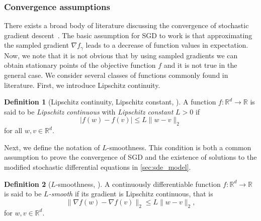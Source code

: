 \documentclass[12pt]{article}
\theoremstyle{definition}
\newtheorem{definition}[definition]{Definition}
\numberwithin{equation}{section}
\newcommand{\R}{\mathbb{R}}
\newcommand{\norm}[1]{\lVert{#1}\rVert_2}
\begin{document}
\subsubsection{Convergence assumptions}
There exists a broad body of literature discussing the convergence of stochastic gradient descent~\cite{allen-zhuConvergenceTheoryDeep2019,mertikopoulosAlmostSureConvergence2020,vaswaniFastFasterConvergence2019,gowerSGDGeneralAnalysis2019,liConvergenceStochasticGradient2019,sebbouhAlmostSureConvergence2021,bottouOptimizationMethodsLargeScale2018}.
The basic assumption for SGD to work is that approximating the sampled gradient $\nabla f_{\gamma}$ leads to a decrease of function values in expectation. Now, we note that it is not obvious that by using sampled gradients we can obtain stationary points of the objective function $f$ and it is not true in the general case. We consider several classes of functions commonly found in literature.
First, we introduce Lipschitz continuity. 
\begin{definition}[Lipschitz continuity, Lipschitz constant, ]
  \label{def:lipschitz_continuity}
  A function $f : \R^d \rightarrow \R$ is said to be \emph{Lipschitz continuous} with \emph{Lipschitz constant} $L >0$ if
  \begin{equation*}
    |f(w) - f(v)| \leq L \norm{w - v}
  \end{equation*}
  for all $w,v \in \R^d$.
\end{definition}
Next, we define the notation of $L$-smoothness. This condition is both a common assumption to prove the convergence of SGD and the existence of solutions to the modified stochastic differential equations in \autoref{sec:sde_model}.
\begin{definition}[$L$-smoothness, ]
  \label{def:l_smooth}
  A continuously differentiable function $f : \R^d \rightarrow \R$ is said to be \emph{$L$-smooth} if its gradient is Lipschitz continuous, that is 
  \begin{equation*}
    \norm{\nabla f(w) - \nabla f(v) } \leq L \norm{w-v},
  \end{equation*}
  for $w,v \in \R^d$.
\end{definition}
\end{document}
